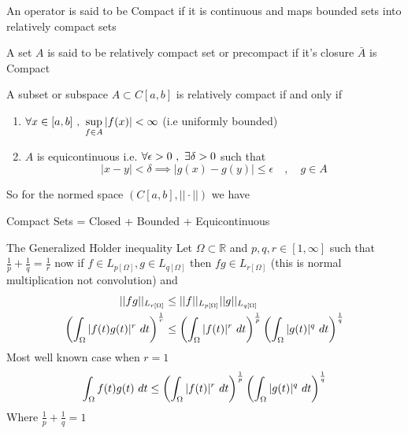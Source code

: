 \begin{definition}
    An operator is said to be Compact if it is continuous and maps bounded sets
into relatively compact sets
\end{definition}
\vmasafa
\begin{definition}
    A set $A$ is said to be relatively compact set or precompact if it's closure $\bar{A}$ is Compact
\end{definition}
\vmasafa
\begin{theorem}
    A subset or subspace $A \subset C[a,b]$ is relatively compact if and only if 
    \begin{enumerate}
        \item $\forall x \in [a,b] \,\,,\,\, \sup\limits_{f \in A}|f(x)| < \infty$ (i.e uniformly bounded)
        \item $A$ is equicontinuous i.e. $\forall \epsilon >0 \,\,,\,\, \exists \delta>0$ such that
            \[
                |x-y|<\delta \implies |g(x)-g(y)|\leq \epsilon \quad,\quad g \in A
            \]        
    \end{enumerate}
    So for the normed space $(C[a,b],||\cdot||)$ we have 
    \begin{center}
        Compact Sets = Closed + Bounded + Equicontinuous
    \end{center}
    
\end{theorem}
\begin{enrichment*}{The Generalized H$\ddot{\text{o}}$lder inequality}
    Let $\Omega \subset \mathbb{R}$ and $p,q,r \in [1,\infty]$ such that $\frac{1}{p}+\frac{1}{q} = \frac{1}{r}$ 
    now if $f \in L_{p[\Omega]},g \in L_{q[\Omega]}$ then $fg \in L_{r[\Omega]}$ (this is normal multiplication not convolution) and 
    \begin{align*}
        ||fg||_{L_{r[\Omega]}} &\leq ||f||_{L_{p[\Omega]}}||g||_{L_{q[\Omega]}}
        \\
        \left( \int_{\Omega} |f(t)g(t)|^r \,\, dt \right)^{\frac{1}{r}} &\leq \left( \int_{\Omega} |f(t)|^r \,\, dt \right)^{\frac{1}{p}}\left( \int_{\Omega} |g(t)|^q \,\, dt \right)^{\frac{1}{q}}
    \end{align*}
    Most well known case when $r = 1$
    \[
        \int_{\Omega} f(t)g(t) \,\, dt \leq \left( \int_{\Omega} |f(t)|^r \,\, dt \right)^{\frac{1}{p}}\left( \int_{\Omega} |g(t)|^q \,\, dt \right)^{\frac{1}{q}}
    \]
    Where $\frac{1}{p}+\frac{1}{q} = 1$
\end{enrichment*}
